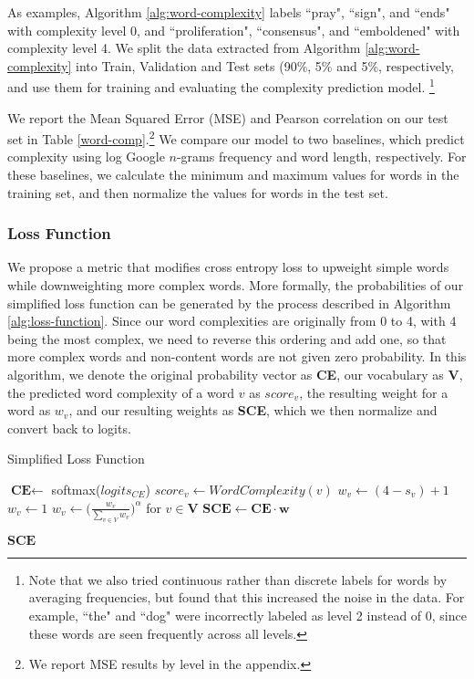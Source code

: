 \documentclass[11pt,a4paper]{article}
\begin{document}
As examples, Algorithm \ref{alg:word-complexity} labels ``pray", ``sign", and ``ends" with complexity level 0, and ``proliferation", ``consensus", and ``emboldened" with complexity level 4. We split the data extracted from Algorithm \ref{alg:word-complexity} into Train, Validation and Test sets (90\%, 5\% and 5\%, respectively, and use them for training and evaluating the complexity prediction model. \footnote{Note that we also tried continuous rather than discrete labels for words by averaging frequencies, but found that this increased the noise in the data. For example, ``the" and ``dog" were incorrectly labeled as level 2 instead of 0, since these words are seen frequently across all levels.}

We report the Mean Squared Error (MSE) and Pearson correlation on our test set in Table \ref{word-comp}.\footnote{We report MSE results by level in the appendix.} We compare our model to two baselines, which predict complexity using log Google $n$-grams frequency \cite{thorsten2006web} and word length, respectively. For these baselines, we calculate the minimum and maximum values for words in the training set, and then normalize the values for words in the test set.

\subsubsection{Loss Function}

We propose a metric that modifies cross entropy loss to upweight simple words while downweighting more complex words. More formally, the probabilities of our simplified loss function can be generated by the process described in Algorithm \ref{alg:loss-function}. Since our word complexities are originally from 0 to 4, with 4 being the most complex, we need to reverse this ordering and add one, so that more complex words and non-content words are not given zero probability. In this algorithm, we denote the original probability vector as \textbf{CE}, our vocabulary as $\textbf{V}$, the predicted word complexity of a word $v$ as $score_v$, the resulting weight for a word as $w_v$, and our resulting weights as \textbf{SCE}, which we then normalize and convert back to logits.

\begin{algorithm}
\caption{Simplified Loss Function}
\label{alg:loss-function}

\begin{algorithmic}[1]
\State $\textbf{CE} \gets$ softmax($logits_{CE}$)
    \State $score_v \gets WordComplexity(v)$
        \State $w_v \gets (4 - s_v) + 1$
    \Else
        \State $w_v \gets 1$
    \EndIf
\EndFor
\State $w_v \gets \Big(\frac{w_v}{\sum_{v\in V}w_v}\Big)^{\alpha}$ for $v \in \textbf{V}$
\State $\textbf{SCE} \gets \textbf{CE} \cdot \textbf{w}$

\Return $\textbf{SCE}$
\EndProcedure
\end{algorithmic}
\end{algorithm}
\end{document}
